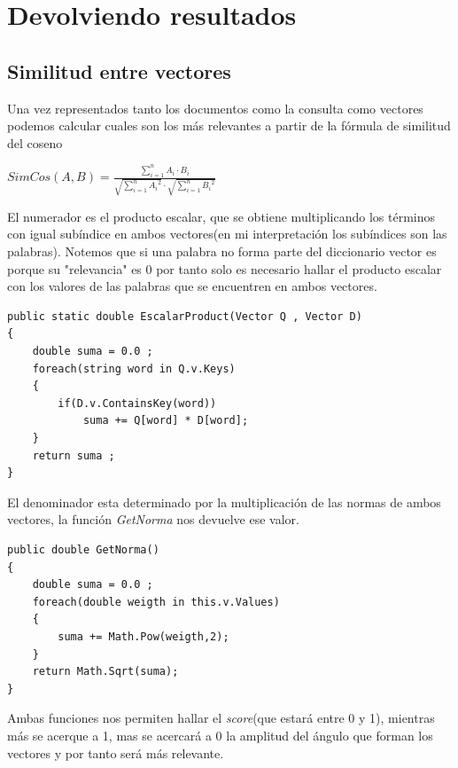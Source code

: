 \documentclass{article}
\begin{document}
\section{Devolviendo resultados}
\subsection{Similitud entre vectores}
Una vez representados tanto los documentos como la consulta como vectores podemos calcular cuales son los más relevantes a partir
de la fórmula de similitud del coseno

\begin{center}
    
    $SimCos(A,B) = \frac{\sum_{i = 1}^{n}A_i  \cdot  B_i}{\sqrt{\sum_{i = 1}^{n}{A_i}^2} \cdot \sqrt{\sum_{i = 1}^{n}{B_i}^2}   } $\\[10pt]
    
\end{center}

El numerador es el producto escalar, que se obtiene multiplicando los términos con igual subíndice en ambos vectores(en mi interpretación 
los subíndices son las palabras). Notemos que si una palabra no forma parte del diccionario vector es porque su "relevancia" es 0
por tanto solo es necesario hallar el producto escalar con los valores de las palabras que se encuentren en ambos vectores.
\\[5pt]

\begin{lstlisting}
public static double EscalarProduct(Vector Q , Vector D)
{
    double suma = 0.0 ;
    foreach(string word in Q.v.Keys)
    {
        if(D.v.ContainsKey(word))
            suma += Q[word] * D[word];
    }
    return suma ;
}

\end{lstlisting}

El denominador esta determinado por la multiplicación de las normas de ambos vectores, la función \textit{GetNorma} nos devuelve
ese valor. \\[5pt]

\begin{lstlisting}
public double GetNorma()
{
    double suma = 0.0 ;
    foreach(double weigth in this.v.Values)
    {
        suma += Math.Pow(weigth,2);
    }
    return Math.Sqrt(suma);
}
\end{lstlisting}
    
Ambas funciones nos permiten hallar el \textit{score}(que estará entre 0 y 1), mientras más se acerque a 1, mas se acercará
a 0 la amplitud del ángulo que forman los vectores y por tanto será más relevante.
\end{document}

